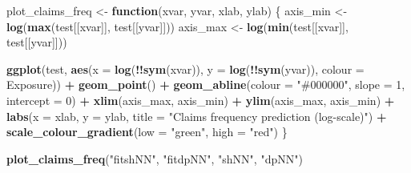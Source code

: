 \documentclass[
]{article}
\newenvironment{Shaded}{\begin{snugshade}}{\end{snugshade}}
\newcommand{\AttributeTok}[1]{\textcolor[rgb]{0.13,0.29,0.53}{#1}}
\newcommand{\ControlFlowTok}[1]{\textcolor[rgb]{0.13,0.29,0.53}{\textbf{#1}}}
\newcommand{\DecValTok}[1]{\textcolor[rgb]{0.00,0.00,0.81}{#1}}
\newcommand{\FunctionTok}[1]{\textcolor[rgb]{0.13,0.29,0.53}{\textbf{#1}}}
\newcommand{\NormalTok}[1]{#1}
\newcommand{\OtherTok}[1]{\textcolor[rgb]{0.56,0.35,0.01}{#1}}
\newcommand{\SpecialCharTok}[1]{\textcolor[rgb]{0.81,0.36,0.00}{\textbf{#1}}}
\newcommand{\StringTok}[1]{\textcolor[rgb]{0.31,0.60,0.02}{#1}}
\begin{document}
\begin{Shaded}
\begin{Highlighting}[]
\NormalTok{plot\_claims\_freq }\OtherTok{\textless{}{-}} \ControlFlowTok{function}\NormalTok{(xvar, yvar, xlab, ylab) \{}
\NormalTok{  axis\_min }\OtherTok{\textless{}{-}} \FunctionTok{log}\NormalTok{(}\FunctionTok{max}\NormalTok{(test[[xvar]], test[[yvar]]))}
\NormalTok{  axis\_max }\OtherTok{\textless{}{-}} \FunctionTok{log}\NormalTok{(}\FunctionTok{min}\NormalTok{(test[[xvar]], test[[yvar]]))}
  
  \FunctionTok{ggplot}\NormalTok{(test, }\FunctionTok{aes}\NormalTok{(}\AttributeTok{x =} \FunctionTok{log}\NormalTok{(}\SpecialCharTok{!!}\FunctionTok{sym}\NormalTok{(xvar)), }\AttributeTok{y =} \FunctionTok{log}\NormalTok{(}\SpecialCharTok{!!}\FunctionTok{sym}\NormalTok{(yvar)), }\AttributeTok{colour =}\NormalTok{ Exposure)) }\SpecialCharTok{+} \FunctionTok{geom\_point}\NormalTok{() }\SpecialCharTok{+}
    \FunctionTok{geom\_abline}\NormalTok{(}\AttributeTok{colour =} \StringTok{"\#000000"}\NormalTok{, }\AttributeTok{slope =} \DecValTok{1}\NormalTok{, }\AttributeTok{intercept =} \DecValTok{0}\NormalTok{) }\SpecialCharTok{+}
    \FunctionTok{xlim}\NormalTok{(axis\_max, axis\_min) }\SpecialCharTok{+} \FunctionTok{ylim}\NormalTok{(axis\_max, axis\_min) }\SpecialCharTok{+}
    \FunctionTok{labs}\NormalTok{(}\AttributeTok{x =}\NormalTok{ xlab, }\AttributeTok{y =}\NormalTok{ ylab, }\AttributeTok{title =} \StringTok{"Claims frequency prediction (log{-}scale)"}\NormalTok{) }\SpecialCharTok{+}
    \FunctionTok{scale\_colour\_gradient}\NormalTok{(}\AttributeTok{low =} \StringTok{"green"}\NormalTok{, }\AttributeTok{high =} \StringTok{"red"}\NormalTok{)}
\NormalTok{\}}
\end{Highlighting}
\end{Shaded}

\begin{Shaded}
\begin{Highlighting}[]
\FunctionTok{plot\_claims\_freq}\NormalTok{(}\StringTok{"fitshNN"}\NormalTok{, }\StringTok{"fitdpNN"}\NormalTok{, }\StringTok{"shNN"}\NormalTok{, }\StringTok{"dpNN"}\NormalTok{)}
\end{Highlighting}
\end{Shaded}
\end{document}
